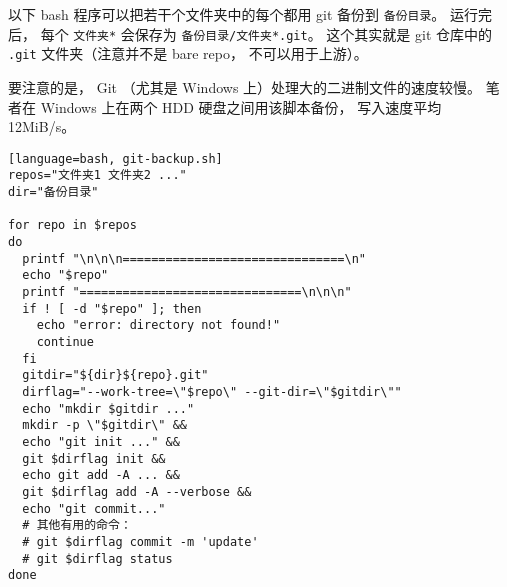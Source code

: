 
\begin{issues}
\issueDraft
\end{issues}


以下 bash 程序可以把若干个文件夹中的每个都用 git 备份到 \verb|备份目录|。 运行完后， 每个 \verb|文件夹*| 会保存为 \verb|备份目录/文件夹*.git|。 这个其实就是 git 仓库中的 \verb|.git| 文件夹（注意并不是 bare repo， 不可以用于上游）。

要注意的是， Git （尤其是 Windows 上）处理大的二进制文件的速度较慢。 笔者在 Windows 上在两个 HDD 硬盘之间用该脚本备份， 写入速度平均 12MiB/s。

\begin{lstlisting}[language=bash, git-backup.sh]
repos="文件夹1 文件夹2 ..."
dir="备份目录"

for repo in $repos
do
  printf "\n\n\n===============================\n"
  echo "$repo"
  printf "===============================\n\n\n"
  if ! [ -d "$repo" ]; then
    echo "error: directory not found!"
    continue
  fi
  gitdir="${dir}${repo}.git"
  dirflag="--work-tree=\"$repo\" --git-dir=\"$gitdir\""
  echo "mkdir $gitdir ..."
  mkdir -p \"$gitdir\" &&
  echo "git init ..." &&
  git $dirflag init &&
  echo git add -A ... &&
  git $dirflag add -A --verbose &&
  echo "git commit..."
  # 其他有用的命令：
  # git $dirflag commit -m 'update'
  # git $dirflag status
done
\end{lstlisting}

